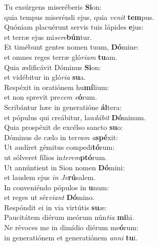 \evenverse Tu exsúrgens miseréberis \textbf{Si}on:~\*\\
\evenverse quia tempus miseréndi ejus, quia \textit{ve}\textit{nit} \textbf{tem}pus.\\
\oddverse Quóniam placuérunt servis tuis lápides \textbf{e}jus:~\*\\
\oddverse et terræ ejus mi\textit{se}\textit{re}\textbf{bún}tur.\\
\evenverse Et timébunt gentes nomen tuum, \textbf{Dó}mine:~\*\\
\evenverse et omnes reges terræ gló\textit{ri}\textit{am} \textbf{tu}am.\\
\oddverse Quia ædificávit Dóminus \textbf{Si}on:~\*\\
\oddverse et vidébitur in gló\textit{ri}\textit{a} \textbf{su}a.\\
\evenverse Respéxit in oratiónem hu\textbf{mí}lium:~\*\\
\evenverse et non sprevit pre\textit{cem} \textit{e}\textbf{ó}rum.\\
\oddverse Scribántur hæc in generatióne \textbf{ál}tera:~\*\\
\oddverse et pópulus qui creábitur, lau\textit{dá}\textit{bit} \textbf{Dó}minum.\\
\evenverse Quia prospéxit de excélso sancto \textbf{su}o:~\*\\
\evenverse Dóminus de cælo in ter\textit{ram} \textit{a}\textbf{spé}xit:\\
\oddverse Ut audíret gémitus compedi\textbf{tó}rum:~\*\\
\oddverse ut sólveret fílios in\textit{te}\textit{rem}\textbf{ptó}rum.\\
\evenverse Ut annúntient in Sion nomen \textbf{Dó}mini:~\*\\
\evenverse et laudem ejus \textit{in} \textit{Je}\textbf{rú}salem.\\
\oddverse In conveniéndo pópulos in \textbf{u}num:~\*\\
\oddverse et reges ut sér\textit{vi}\textit{ant} \textbf{Dó}mino.\\
\evenverse Respóndit ei in via virtútis \textbf{su}æ:~\*\\
\evenverse Paucitátem diérum meórum nún\textit{ti}\textit{a} \textbf{mi}hi.\\
\oddverse Ne révoces me in dimídio diérum me\textbf{ó}rum:~\*\\
\oddverse in generatiónem et generatiónem \textit{an}\textit{ni} \textbf{tu}i.\\
